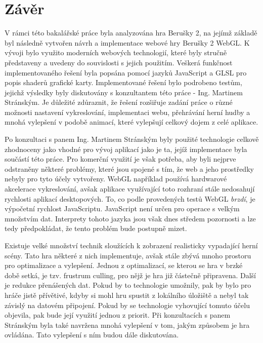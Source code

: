\chapter{Závěr}
\label{chap:zaver}
V rámci této bakalářské práce byla analyzována hra Berušky 2, na jejímž základě byl následně vytvořen návrh a implementace webové hry Berušky 2 WebGL. K vývoji bylo využito moderních webových technologií, které byly stručně představeny a uvedeny do souvislosti s jejich použitím. Veškerá funkčnost implementovaného řešení byla popsána pomocí jazyků JavaScript a GLSL pro popis shaderů grafické karty. Implementované řešení bylo podrobeno testům, jejichž výsledky byly diskutovány s konzultantem této práce - Ing. Martinem Stránským. Je důležité zdůraznit, že řešení rozšiřuje zadání práce o různé možnosti nastavení vykreslování, implementaci webu, přehrávání herní hudby a mnohá vylepšení v podobě animací, které vylepšují celkový dojem z celé aplikace.

Po konzultaci s panem Ing. Martinem Stránským byly použité technologie celkově zhodnoceny jako vhodné pro vývoj aplikací jako je ta, jejíž implementace byla součástí této práce. Pro komerční využití je však potřeba, aby byli nejprve odstraněny některé problémy, které jsou spojené s tím, že web a jeho prostředky nebyly pro tyto účely vytvořeny. WebGL například používá hardwarové akcelerace vykreslování, avšak aplikace využívající toto rozhraní stále nedosahují rychlosti aplikací desktopových. To, co podle provedených testů WebGL \textit{brzdí}, je výpočetní rychlost JavaScriptu. JavaScript není určen pro operace s velkým množstvím dat. Interprety tohoto jazyka jsou však dnes středem pozornosti a lze tedy předpokládat, že tento problém bude postupně mizet.

Existuje velké množství technik sloužících k zobrazení realisticky vypadající herní scény. Tato hra některé z nich implementuje, avšak stále zbývá mnoho prostoru pro optimalizace a vylepšení. Jednou z optimalizací, se kterou se hra v brzké době setká, je tzv. frustrum culling, pro nějž je hra již částečně připravena. Další je redukce přenášených dat. Pokud by to technologie umožnily, pak by bylo pro hráče jistě přívětivé, kdyby si mohl hru spustit z lokálního úložiště a nebyl tak závislý na datovém připojení. Pokud by se technologie vyhovující tomuto účelu objevila, pak bude její využití jednou z priorit. Při konzultacích s panem Stránským byla také navržena mnohá vylepšení v tom, jakým způsobem je hra ovládána. Tato vylepšení s ním budou dále diskutována.
